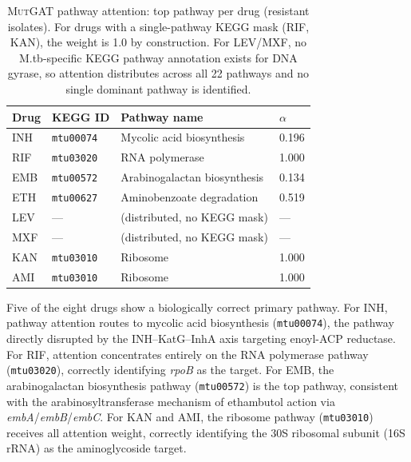 \documentclass{article}
\theoremstyle{plain}
\theoremstyle{definition}
\theoremstyle{remark}
\begin{document}
\begin{table}[t]
\caption{\textsc{MutGAT} pathway attention: top pathway per drug (resistant isolates). For drugs with a single-pathway KEGG mask (RIF, KAN), the weight is 1.0 by construction. For LEV/MXF, no M.tb-specific KEGG pathway annotation exists for DNA gyrase, so attention distributes across all 22 pathways and no single dominant pathway is identified.}
\label{tab:pathway_attn}
\vskip 0.1in
\begin{center}
\begin{small}
\begin{tabular}{llll}
\toprule
Drug & KEGG ID & Pathway name & $\alpha$ \\
\midrule
INH  & \texttt{mtu00074} & Mycolic acid biosynthesis    & 0.196 \\
RIF  & \texttt{mtu03020} & RNA polymerase               & 1.000 \\
EMB  & \texttt{mtu00572} & Arabinogalactan biosynthesis & 0.134 \\
ETH  & \texttt{mtu00627} & Aminobenzoate degradation    & 0.519 \\
LEV  & ---               & (distributed, no KEGG mask)  & ---   \\
MXF  & ---               & (distributed, no KEGG mask)  & ---   \\
KAN  & \texttt{mtu03010} & Ribosome                     & 1.000 \\
AMI  & \texttt{mtu03010} & Ribosome                     & 1.000 \\
\bottomrule
\end{tabular}
\end{small}
\end{center}
\vskip -0.1in
\end{table}

Five of the eight drugs show a biologically correct primary pathway. For INH, pathway attention routes to mycolic acid biosynthesis (\texttt{mtu00074}), the pathway directly disrupted by the INH--KatG--InhA axis targeting enoyl-ACP reductase. For RIF, attention concentrates entirely on the RNA polymerase pathway (\texttt{mtu03020}), correctly identifying \textit{rpoB} as the target. For EMB, the arabinogalactan biosynthesis pathway (\texttt{mtu00572}) is the top pathway, consistent with the arabinosyltransferase mechanism of ethambutol action via \textit{embA}/\textit{embB}/\textit{embC}. For KAN and AMI, the ribosome pathway (\texttt{mtu03010}) receives all attention weight, correctly identifying the 30S ribosomal subunit (16S rRNA) as the aminoglycoside target.
\end{document}
